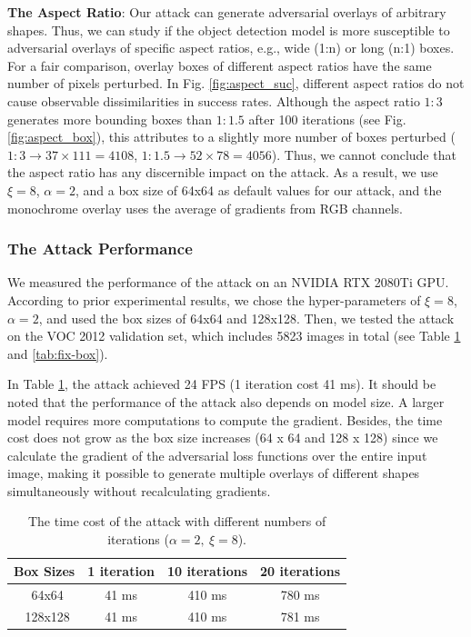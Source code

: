 \textbf{The Aspect Ratio}: Our attack can generate adversarial overlays of arbitrary shapes. Thus, we can study if the object detection model is more susceptible to adversarial overlays of specific aspect ratios, e.g., wide (1:n) or long (n:1) boxes. For a fair comparison, overlay boxes of different aspect ratios have the same number of pixels perturbed. In Fig. \ref{fig:aspect_suc}, different aspect ratios do not cause observable dissimilarities in success rates. Although the aspect ratio $1:3$ generates more bounding boxes than $1:1.5$ after 100 iterations (see Fig. \ref{fig:aspect_box}), this attributes to a slightly more number of boxes perturbed ($1:3 \rightarrow 37 \times 111 = 4108$, $1:1.5 \rightarrow 52 \times 78 = 4056$). Thus, we cannot conclude that the aspect ratio has any discernible impact on the attack. As a result, we use $\xi=8$, $\alpha=2$, and a box size of 64x64 as default values for our attack, and the monochrome overlay uses the average of gradients from RGB channels.

\subsubsection{The Attack Performance}

We measured the performance of the attack on an NVIDIA RTX 2080Ti GPU. According to prior experimental results, we chose the hyper-parameters of $\xi=8$, $\alpha=2$, and used the box sizes of 64x64 and 128x128. Then, we tested the attack on the VOC 2012 validation set, which includes 5823 images in total (see Table \ref{tab:fix-it} and \ref{tab:fix-box}).



In Table \ref{tab:fix-it}, the attack achieved 24 FPS (1 iteration cost 41 ms). It should be noted that the performance of the attack also depends on model size. A larger model requires more computations to compute the gradient. Besides, the time cost does not grow as the box size increases (64 x 64 and 128 x 128) since we calculate the gradient of the adversarial loss functions over the entire input image, making it possible to generate multiple overlays of different shapes simultaneously without recalculating gradients.

\begin{table}[H]
    \centering
    \begin{tabular}{cccc}
    \hline
    Box Sizes & 1 iteration & 10 iterations & 20 iterations\\
    \hline
    \ 64x64    & 41 ms  & 410 ms & 780 ms \\
    \ 128x128  & 41 ms  & 410 ms & 781 ms \\
    \hline
    \end{tabular}
    \caption{The time cost of the attack with different numbers of iterations ($\alpha=2,\ \xi=8$).}
    \label{tab:fix-it}
\end{table}

